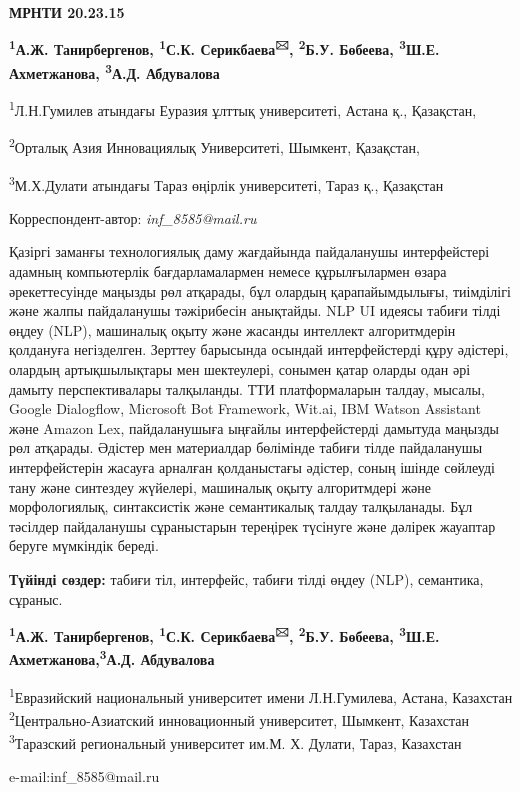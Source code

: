 \newpage
{\bfseries МРНТИ 20.23.15}


\begin{center}
{\bfseries \textsuperscript{1}А.Ж. Танирбергенов, \textsuperscript{1}С.К.
Серикбаева\textsuperscript{🖂}, \textsuperscript{2}Б.У. Бөбеева,
\textsuperscript{3}Ш.Е. Ахметжанова, \textsuperscript{3}А.Д. Абдувалова}

\textsuperscript{1}Л.Н.Гумилев атындағы Еуразия ұлттық университеті,
Астана қ., Қазақстан,

\textsuperscript{2}Орталық Азия Инновациялық Университеті, Шымкент,
Қазақстан,

\textsuperscript{3}М.Х.Дулати атындағы Тараз өңірлік университеті, Тараз
қ., Қазақстан
\end{center}
Корреспондент-автор:  \emph{inf\_8585@mail.ru}



Қазіргі заманғы технологиялық даму жағдайында пайдаланушы интерфейстері
адамның компьютерлік бағдарламалармен немесе құрылғылармен өзара
әрекеттесуінде маңызды рөл атқарады, бұл олардың қарапайымдылығы,
тиімділігі және жалпы пайдаланушы тәжірибесін анықтайды. NLP UI идеясы
табиғи тілді өңдеу (NLP), машиналық оқыту және жасанды интеллект
алгоритмдерін қолдануға негізделген. Зерттеу барысында осындай
интерфейстерді құру әдістері, олардың артықшылықтары мен шектеулері,
сонымен қатар оларды одан әрі дамыту перспективалары талқыланды. ТТИ
платформаларын талдау, мысалы, Google Dialogflow, Microsoft Bot
Framework, Wit.ai, IBM Watson Assistant және Amazon Lex, пайдаланушыға
ыңғайлы интерфейстерді дамытуда маңызды рөл атқарады. Әдістер мен
материалдар бөлімінде табиғи тілде пайдаланушы интерфейстерін жасауға
арналған қолданыстағы әдістер, соның ішінде сөйлеуді тану және синтездеу
жүйелері, машиналық оқыту алгоритмдері және морфологиялық, синтаксистік
және семантикалық талдау талқыланады. Бұл тәсілдер пайдаланушы
сұраныстарын тереңірек түсінуге және дәлірек жауаптар беруге мүмкіндік
береді.

{\bfseries Түйінді сөздер:} табиғи тіл, интерфейс, табиғи тілді өңдеу
(NLP), семантика, сұраныс.



\begin{center}

{\bfseries \textsuperscript{1}А.Ж. Танирбергенов, \textsuperscript{1}С.К.
Серикбаева\textsuperscript{🖂}, \textsuperscript{2}Б.У. Бөбеева,
\textsuperscript{3}Ш.Е. Ахметжанова,\textsuperscript{3}А.Д. Абдувалова}

\textsuperscript{1}Евразийский национальный университет имени
Л.Н.Гумилева, Астана, Казахстан \textsuperscript{2}Центрально-Азиатский
инновационный университет, Шымкент, Казахстан \\ \textsuperscript{3}Таразский региональный университет им.М. Х. Дулати,
Тараз, Казахстан

e-mail:inf\_8585@mail.ru
\end{center}

